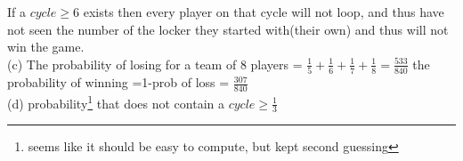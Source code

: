 \documentclass{article}
\newcounter{prob}\setcounter{prob}{1}\newcommand{\prob}{\arabic{prob}.\indent \addtocounter{prob}{1}}
\begin{document}
If a $cycle \geq 6$ exists then every player on that cycle will not loop, and 
thus have not seen the number of the locker they started with(their own) and thus will not win the game.\\

(c) The probability of losing for a team of 8 players = $\frac{1}{5}+\frac{1}{6}+\frac{1}{7}+\frac{1}{8}=\frac{533}{840}$
the probability of winning =1-prob of loss = $\frac{307}{840}$\\

(d) probability\footnote{seems like it should be easy to compute, but kept second guessing} that does not contain a $cycle \geq \frac{1}{3}$ 
\end{document}
